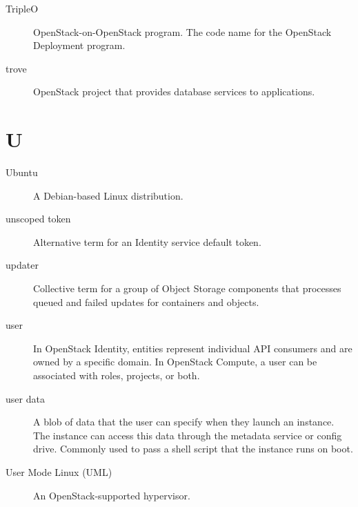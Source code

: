 \documentclass[letterpaper,10pt,english]{sphinxmanual}
\begin{document}
\begin{description}
\item[{TripleO}] \leavevmode{}\label{_source/glossary:term-tripleo}
OpenStack-on-OpenStack program. The code name for the
OpenStack Deployment program.

\item[{trove}] \leavevmode{}\label{_source/glossary:term-trove}
OpenStack project that provides database services to
applications.

\end{description}


\section{U}
\label{_source/glossary:u}\begin{description}
\item[{Ubuntu}] \leavevmode{}\label{_source/glossary:term-ubuntu}
A Debian-based Linux distribution.

\item[{unscoped token}] \leavevmode{}\label{_source/glossary:term-unscoped-token}
Alternative term for an Identity service default token.

\item[{updater}] \leavevmode{}\label{_source/glossary:term-updater}
Collective term for a group of Object Storage components that
processes queued and failed updates for containers and objects.

\item[{user}] \leavevmode{}\label{_source/glossary:term-user}
In OpenStack Identity,  entities represent individual API
consumers and are owned by a specific domain. In OpenStack Compute,
a user can be associated with roles, projects, or both.

\item[{user data}] \leavevmode{}\label{_source/glossary:term-user-data}
A blob of data that the user can specify when they launch
an instance. The instance can access this data through the
metadata service or config drive.
Commonly used to pass a shell script that the instance runs on boot.

\item[{User Mode Linux (UML)}] \leavevmode{}\label{_source/glossary:term-user-mode-linux-uml}
An OpenStack-supported hypervisor.

\end{description}
\end{document}
